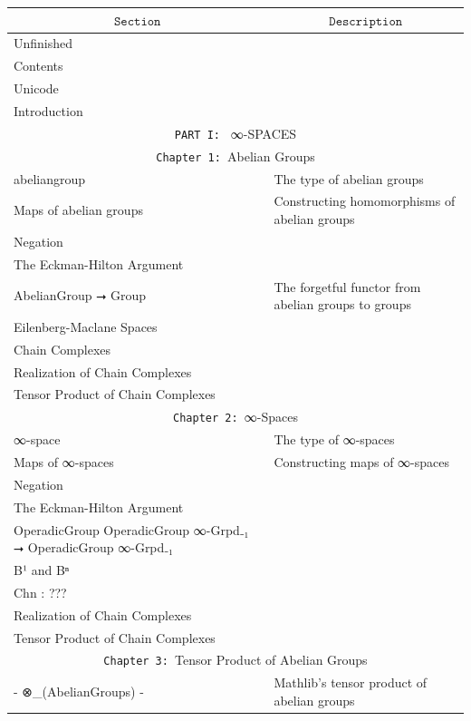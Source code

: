 \documentclass{book}
\theoremstyle{definition}
\begin{document}
{
\footnotesize
\begin{longtable}{|| l || l ||} 
\hline
\multicolumn{1}{||c||}{$\texttt{Section}$} & \multicolumn{1}{|c||}{$\texttt{Description}$} \\
\hline
\hline
Unfinished & \\
\hline
Contents & \\
\hline
Unicode & \\
\hline
Introduction & \\
\hline \hline
\multicolumn{2}{||c||}{\texttt{PART I: } ∞-SPACES} \\
\hline \hline
 \multicolumn{2}{||c||}{\texttt{Chapter 1: }Abelian Groups} \\
\hline \hline
abeliangroup & The type of abelian groups \\
\hline
Maps of abelian groups & Constructing homomorphisms of abelian groups \\
\hline
Negation & \\
\hline
The Eckman-Hilton Argument & \\
\hline
AbelianGroup ⭢ Group & The forgetful functor from abelian groups to groups \\
\hline
Eilenberg-Maclane Spaces & \\
\hline
Chain Complexes & \\
\hline
Realization of Chain Complexes & \\
\hline
Tensor Product of Chain Complexes & \\
\hline \hline
 \multicolumn{2}{||c||}{\texttt{Chapter 2: }∞-Spaces} \\
\hline \hline
∞-space & The type of ∞-spaces \\
\hline
Maps of ∞-spaces & Constructing maps of ∞-spaces \\
\hline
Negation & \\
\hline
The Eckman-Hilton Argument & \\
\hline
OperadicGroup OperadicGroup ∞-Grpd₋₁ ⭢ OperadicGroup ∞-Grpd₋₁ & \\
\hline
B¹ and Bⁿ & \\
\hline
Chn : ??? & \\
\hline
Realization of Chain Complexes & \\
\hline
Tensor Product of Chain Complexes & \\
\hline \hline
\multicolumn{2}{||c||}{\texttt{Chapter 3: }Tensor Product of Abelian Groups} \\
\hline \hline
- ⊗\_(AbelianGroups) - & Mathlib's tensor product of abelian groups \\

\end{longtable}}
\end{document}

